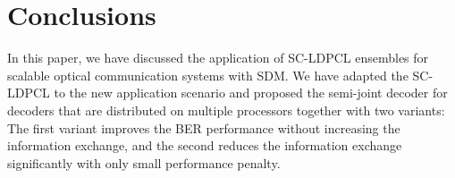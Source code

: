 \section{Conclusions}
In this paper, we have discussed the application of SC-LDPCL ensembles for scalable optical communication systems with SDM. We have adapted the SC-LDPCL to the new application scenario and proposed the semi-joint decoder for decoders that are distributed on multiple processors together with two variants: The first variant improves the BER performance without increasing the information exchange, and the second reduces the information exchange significantly with only small performance penalty.